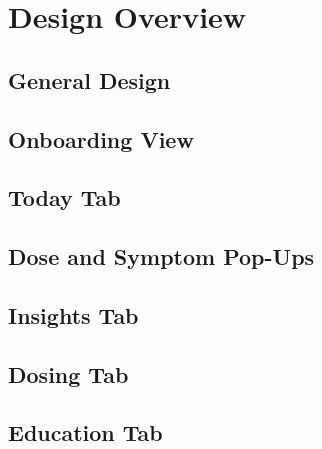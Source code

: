 \chapter{Design Overview}

\section{General Design}

\section{Onboarding View}

\section{Today Tab}

\section{Dose and Symptom Pop-Ups}

\section{Insights Tab}

\section{Dosing Tab}

\section{Education Tab}